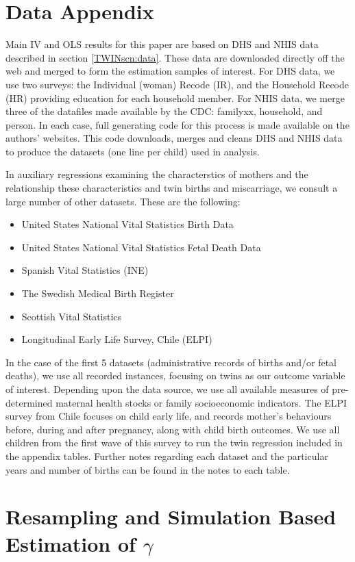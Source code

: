 \documentclass[a4paper, 11pt]{article}
\theoremstyle{plain}
\begin{document}
\newpage
\section{Data Appendix}
\label{TWINscn:dataApp}
Main IV and OLS results for this paper are based on DHS and NHIS data described
in section \ref{TWINscn:data}.  These data are downloaded directly off the web
and merged to form the estimation samples of interest. For DHS data, we use two
surveys: the Individual (woman) Recode (IR), and the Household Recode (HR)
providing education for each household member.  For NHIS data, we merge three
of the datafiles made available by the CDC: familyxx, household, and person.
In each case, full generating code for this process is made available on the
authors' websites.  This code downloads, merges and cleans DHS and NHIS data to
produce the datasets (one line per child) used in analysis.

In auxiliary regressions examining the characterstics of mothers and the
relationship these characteristics and twin births and miscarriage, we consult
a large number of other datasets.  These are the following:
\begin{itemize}
\item United States National Vital Statistics Birth Data
\item United States National Vital Statistics Fetal Death Data
\item Spanish Vital Statistics (INE)
\item The Swedish Medical Birth Register
\item Scottish Vital Statistics
\item Longitudinal Early Life Survey, Chile (ELPI)
\end{itemize}

In the case of the first 5 datasets (administrative records of births and/or
fetal deaths), we use all recorded instances, focusing on twins as our
outcome variable of interest.  Depending upon the data source, we use all
available measures of pre-determined maternal health stocks or family
socioeconomic indicators.  The ELPI survey from Chile focuses on child early
life, and records mother's behaviours before, during and after pregnancy,
along with child birth outcomes.  We use all children from the first wave of
this survey to run the twin regression included in the appendix tables.
Further notes regarding each dataset and the particular years and number of
births can be found in the notes to each table.

\section{Resampling and Simulation Based Estimation of $\gamma$}
\label{ATWINscn:gammaSim}
\end{document}
